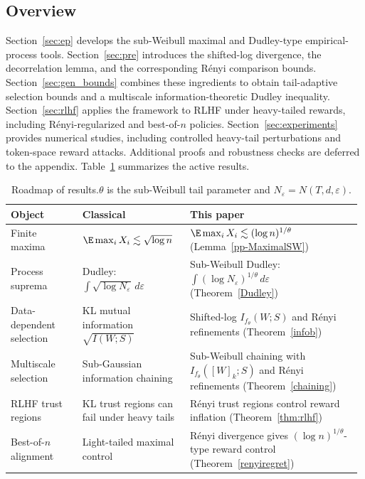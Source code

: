 \documentclass[11pt]{article}
\begin{document}
\subsection*{Overview}
Section~\ref{sec:ep} develops the sub-Weibull maximal and Dudley-type
empirical-process tools. Section~\ref{sec:pre} introduces the shifted-log
divergence, the decorrelation lemma, and the corresponding R\'enyi comparison
bounds. Section~\ref{sec:gen_bounds} combines these ingredients to obtain
tail-adaptive selection bounds and a multiscale information-theoretic Dudley
inequality. Section~\ref{sec:rlhf} applies the framework to RLHF under
heavy-tailed rewards, including R\'enyi-regularized and best-of-$n$ policies.
Section~\ref{sec:experiments} provides numerical studies, including controlled
heavy-tail perturbations and token-space reward attacks. Additional proofs and
robustness checks are deferred to the appendix. Table~\ref{tab:roadmap}
summarizes the active results.


\begin{table}[t]
\centering
\footnotesize
\setlength{\tabcolsep}{4pt}
\renewcommand{\arraystretch}{1.05}
\begin{tabular}{@{}>{\raggedright\arraybackslash}p{0.20\linewidth}
                >{\raggedright\arraybackslash}p{0.30\linewidth}
                >{\raggedright\arraybackslash}p{0.48\linewidth}@{}}
\toprule
\textbf{Object} & \textbf{Classical} & \textbf{This paper} \\
\midrule
Finite maxima &
$\E\max_i X_i\lesssim\sqrt{\log n}$ &
$\E\max_i X_i\lesssim(\log n)^{1/\theta}$ (Lemma~\ref{pp-MaximalSW}) \\
Process suprema &
Dudley: $\int\sqrt{\log N_\varepsilon}\,d\varepsilon$ &
Sub-Weibull Dudley: $\int(\log N_\varepsilon)^{1/\theta}\,d\varepsilon$ (Theorem~\ref{Dudley}) \\
Data-dependent selection &
KL mutual information $\sqrt{I(W;S)}$ &
Shifted-log $I_{f_\theta}(W;S)$ and R\'enyi refinements (Theorem~\ref{infob}) \\
Multiscale selection &
Sub-Gaussian information chaining &
Sub-Weibull chaining with $I_{f_\theta}([W]_k;S)$ and R\'enyi refinements (Theorem~\ref{chaining}) \\
RLHF trust regions &
KL trust regions can fail under heavy tails &
R\'enyi trust regions control reward inflation (Theorem~\ref{thm:rlhf}) \\
Best-of-$n$ alignment &
Light-tailed maximal control &
R\'enyi divergence gives $(\log n)^{1/\theta}$-type reward control (Theorem~\ref{renyiregret}) \\
\bottomrule
\end{tabular}
\caption{Roadmap of results.$\theta$ is the sub-Weibull tail parameter and $N_\varepsilon=N(T,d,\varepsilon)$.}
\label{tab:roadmap}
\end{table}
\end{document}
